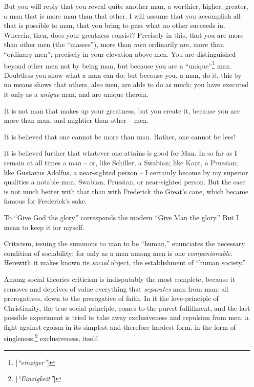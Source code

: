 But you will reply that you reveal quite another man, a worthier, higher, 
greater, a man that is more man than that other. I will assume that you 
accomplish all that is possible to man, that you bring to pass what no other 
succeeds in. Wherein, then, does your greatness consist? Precisely in this, 
that you are more than other men (the ``masses''), more than \textit{men} 
ordinarily are, more than ``ordinary men''; precisely in your elevation 
above men. You are distinguished beyond other men not by being man, but 
because you are a ``unique''\footnote{[\textit{``einziger''}]} man. 
Doubtless you show what a man can do; but because you, a man, do it, this by 
no means shows that others, also men, are able to do as much; you have 
executed it only as a \textit{unique} man, and are unique therein.

It is not man that makes up your greatness, but you create it, because you are 
more than man, and mightier than other -- men.

It is believed that one cannot be more than man. Rather, one cannot be less!

It is believed further that whatever one attains is good for Man. In so far as 
I remain at all times a man -- or, like Schiller, a Swabian; like Kant, a 
Prussian; like Gustavus Adolfus, a near-sighted person -- I certainly become 
by my superior qualities a notable man, Swabian, Prussian, or near-sighted 
person. But the case is not much better with that than with Frederick the 
Great's cane, which became famous for Frederick's sake.

To ``Give God the glory'' corresponds the modern ``Give Man the glory.'' 
But I mean to keep it for myself.

Criticism, issuing the summons to man to be ``human,'' enunciates the 
necessary condition of sociability; for only as a man among men is one 
\textit{companionable}. Herewith it makes known its \textit{social} object, 
the establishment of ``human society.''

Among social theories criticism is indisputably the most complete, because it 
removes and deprives of value everything that \textit{separates} man from man: 
all prerogatives, down to the prerogative of faith. In it the love-principle 
of Christianity, the true social principle, comes to the purest fulfillment, 
and the last possible experiment is tried to take away exclusiveness and 
repulsion from men: a fight against egoism in its simplest and therefore 
hardest form, in the form of singleness,\footnote{[\textit{``Einzigkeit''}]} 
exclusiveness, itself.

